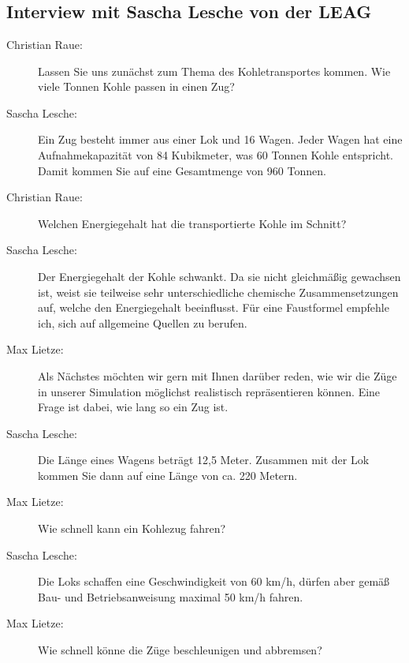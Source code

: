 \chapter{\appendixname}

\section*{Interview mit Sascha Lesche von der LEAG}

\begin{description}

    \item[Christian Raue:] Lassen Sie uns zunächst zum Thema des Kohletransportes kommen. Wie viele Tonnen Kohle passen in einen Zug?

    \item[Sascha Lesche:] Ein Zug besteht immer aus einer Lok und 16 Wagen. Jeder Wagen hat eine Aufnahmekapazität von 84 Kubikmeter, was 60 Tonnen Kohle entspricht. Damit kommen Sie auf eine Gesamtmenge von 960 Tonnen.

    \item[Christian Raue:] Welchen Energiegehalt hat die transportierte Kohle im Schnitt?

    \item[Sascha Lesche:] Der Energiegehalt der Kohle schwankt. Da sie nicht gleichmäßig gewachsen ist, weist sie teilweise sehr unterschiedliche chemische Zusammensetzungen auf, welche den Energiegehalt beeinflusst. Für eine Faustformel empfehle ich, sich auf allgemeine Quellen zu berufen.

    \item[Max Lietze:] Als Nächstes möchten wir gern mit Ihnen darüber reden, wie wir die Züge in unserer Simulation möglichst realistisch repräsentieren können. Eine Frage ist dabei, wie lang so ein Zug ist.

    \item[Sascha Lesche:] Die Länge eines Wagens beträgt 12,5 Meter. Zusammen mit der Lok kommen Sie dann auf eine Länge von ca. 220 Metern.

    \item[Max Lietze:] Wie schnell kann ein Kohlezug fahren?

    \item[Sascha Lesche:] Die Loks schaffen eine Geschwindigkeit von 60 km/h, dürfen aber gemäß Bau- und Betriebsanweisung maximal 50 km/h fahren.

    \item[Max Lietze:] Wie schnell könne die Züge beschleunigen und abbremsen?


\end{description}

